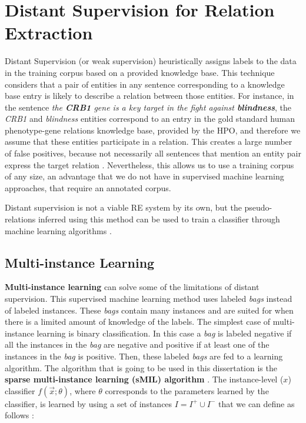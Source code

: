 \section{Distant Supervision for Relation Extraction}

Distant Supervision (or weak supervision) heuristically assigns labels to the data in the training corpus based on a provided knowledge base. This technique considers that a pair of entities in any sentence corresponding to a knowledge base entry is likely to describe a relation between those entities. For instance, in the sentence \textit{the \textbf{CRB1} gene is a key target in the fight against \textbf{blindness}}, the \textit{CRB1} and \textit{blindness} entities correspond to an entry in the gold standard human phenotype-gene relations knowledge base, provided by the HPO, and therefore we assume that these entities participate in a relation. This creates a large number of false positives, because not necessarily all sentences that mention an entity pair express the target relation \citep{jiang-etal-2018-revisiting}. Nevertheless, this allows us to use a training corpus of any size, an advantage that we do not have in supervised machine learning approaches, that require an annotated corpus. 

Distant supervision is not a viable RE system by its own, but the pseudo-relations inferred using this method can be used to train a classifier through machine learning algorithms \citep{10.1371/journal.pone.0171929}. 


\hypertarget{2.4}{\subsection{Multi-instance Learning}}

\textbf{Multi-instance learning} \citep{Dietterich:1997:SMI:249678.249682} can solve some of the limitations of distant supervision. This supervised machine learning method uses labeled \textit{bags} instead of labeled instances. These \textit{bags} contain many instances and are suited for when there is a limited amount of knowledge of the labels. The simplest case of multi-instance learning is binary classification. In this case a \textit{bag} is labeled negative if all the instances in the \textit{bag} are negative and positive if at least one of the instances in the \textit{bag} is positive. Then, these labeled \textit{bags} are fed to a learning algorithm. The algorithm that is going to be used in this dissertation is the \textbf{sparse multi-instance learning (sMIL) algorithm} \citep{Bunescu:2007:MIL:1273496.1273510}. The instance-level ($x$) classifier $f(\overrightarrow{x};\theta)$, where $\theta$ corresponds to the parameters learned by the classifier, is learned by using a set of instances $I = I^+ \cup I^-$ that we can define as follows \citep{AMORES201381}:

